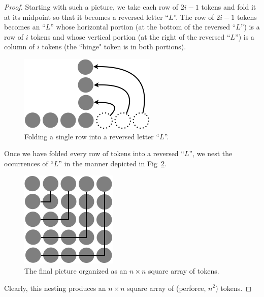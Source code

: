 \begin{proof}
Starting with such a picture, we take each row of $2i-1$ tokens and
fold it at its midpoint so that it becomes a reversed letter ``$L$''.
The row of $2i-1$ tokens becomes an ``$L$'' whose horizontal portion
(at the bottom of the reversed ``$L$'') is a row of $i$ tokens and
whose vertical portion (at the right of the reversed ``$L$'') is a
column of $i$ tokens (the ``hinge" token is in both portions).
\begin{figure}[ht]
\begin{center}
       \includegraphics[scale=0.4]{FiguresMaths/SumOddsIntermediate}
              \caption{Folding a single row into a reversed letter ``$L$''.}
       \label{fig:sumOdds2}
\end{center}
\end{figure}

Once we have folded every row of tokens into a reversed ``$L$'', we
nest the occurrences of ``$L$'' in the manner depicted in
Fig~\ref{fig:sumOdds3}.
\begin{figure}[ht]
\begin{center}
       \includegraphics[scale=0.4]{FiguresMaths/SumOddsFinal}
\caption{The final picture organized as an $n \times n$ square
  array of tokens.}
       \label{fig:sumOdds3}
\end{center}
\end{figure}
Clearly, this nesting produces an $n \times n$ square array of
(perforce, $n^2$) tokens.
\end{proof}

\medskip


